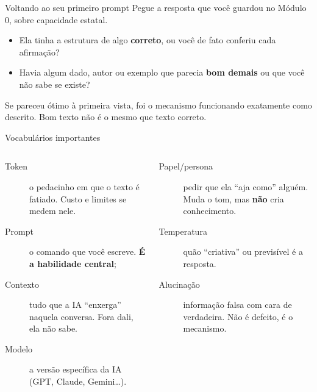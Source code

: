 \documentclass[11pt,aspectratio=169,t]{beamer}
\begin{document}
\begin{frame}{Voltando ao seu primeiro prompt}
  \small
  Pegue a resposta que você guardou no Módulo 0, sobre capacidade estatal.
  \begin{itemize}
    \item Ela tinha a estrutura de algo \textbf{correto}, ou você de fato conferiu cada afirmação?
    \item Havia algum dado, autor ou exemplo que parecia \textbf{bom demais} ou que você não sabe se existe?
  \end{itemize}
  \pause
  \vfill
  \begin{alertblock}{}
    \centering Se pareceu ótimo à primeira vista, foi o mecanismo funcionando exatamente como descrito. Bom texto não é o mesmo que texto correto.
  \end{alertblock}
\end{frame}
\begin{frame}{Vocabulários importantes}
  \small
  \begin{columns}[t]
    \begin{description}
      \item[Token] o pedacinho em que o texto é fatiado. Custo e limites se medem nele.
      \item[Prompt] o comando que você escreve. \textbf{É a habilidade central};
      \item[Contexto] tudo que a IA ``enxerga'' naquela conversa. Fora dali, ela não sabe.
      \item[Modelo] a versão específica da IA (GPT, Claude, Gemini\ldots).
    \end{description}
    \begin{description}
      \item[Papel/persona] pedir que ela ``aja como'' alguém. Muda o tom, mas \textbf{não} cria conhecimento.
      \item[Temperatura] quão ``criativa'' ou previsível é a resposta.
      \item[Alucinação] informação falsa com cara de verdadeira. \alert{Não é defeito, é o mecanismo.}
    \end{description}
  \end{columns}
\end{frame}
\end{document}
